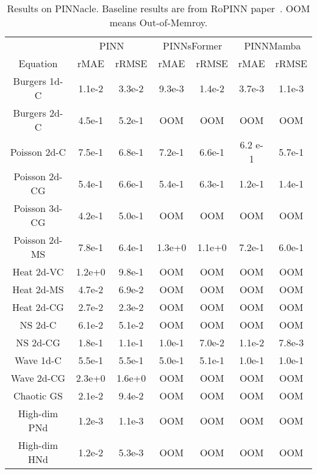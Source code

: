 \begin{table}[H]
\vspace{-3mm}
  \caption{Results on PINNacle. Baseline results are from RoPINN paper~\cite{wu2024ropinn}. OOM means Out-of-Memroy.}
  
  \centering
    \small
  \begin{tabular}{c|cc|cc|cc}

    \toprule 
      &\multicolumn{2}{c}{PINN }&\multicolumn{2}{c}{PINNsFormer}&\multicolumn{2}{c}{PINNMamba}\\
    \cmidrule(lr){2-3}\cmidrule(lr){4-5}\cmidrule(lr){6-7}
   Equation & rMAE & rRMSE & rMAE & rRMSE & rMAE & rRMSE\\
   \midrule
   Burgers 1d-C &1.1e-2& 3.3e-2 & 9.3e-3 & 1.4e-2 & 3.7e-3 & 1.1e-3 \\
 Burgers 2d-C & 4.5e-1& 5.2e-1&  OOM & OOM & OOM & OOM \\
 Poisson 2d-C & 7.5e-1 & 6.8e-1 & 7.2e-1 & 6.6e-1 & 6.2 e-1 & 5.7e-1 \\
Poisson 2d-CG & 5.4e-1 & 6.6e-1 & 5.4e-1& 6.3e-1 & 1.2e-1 & 1.4e-1 \\
Poisson 3d-CG & 4.2e-1 & 5.0e-1 & OOM& OOM & OOM & OOM \\
Poisson 2d-MS & 7.8e-1 & 6.4e-1 & 1.3e+0& 1.1e+0 & 7.2e-1& 6.0e-1 \\
Heat 2d-VC & 1.2e+0 & 9.8e-1 & OOM& OOM &OOM &OOM  \\
Heat 2d-MS & 4.7e-2 & 6.9e-2 &OOM & OOM &OOM &OOM  \\
Heat 2d-CG & 2.7e-2 & 2.3e-2 & OOM& OOM &OOM &OOM  \\
NS 2d-C & 6.1e-2 & 5.1e-2 & OOM& OOM & OOM& OOM \\
NS 2d-CG & 1.8e-1 & 1.1e-1 & 1.0e-1& 7.0e-2 & 1.1e-2& 7.8e-3  \\
Wave 1d-C & 5.5e-1 & 5.5e-1 & 5.0e-1 & 5.1e-1 & 1.0e-1 & 1.0e-1 \\ 
Wave 2d-CG & 2.3e+0 & 1.6e+0 &OOM & OOM  &OOM &OOM  \\
Chaotic GS & 2.1e-2 & 9.4e-2 & OOM& OOM & OOM &OOM  \\
High-dim PNd & 1.2e-3 & 1.1e-3 &OOM &OOM  &OOM &OOM  \\
High-dim HNd & 1.2e-2 & 5.3e-3 &OOM &OOM  &OOM &OOM  \\
   

    \bottomrule
  \end{tabular}
  \normalsize
  \label{tab:pinnacle}

\end{table}